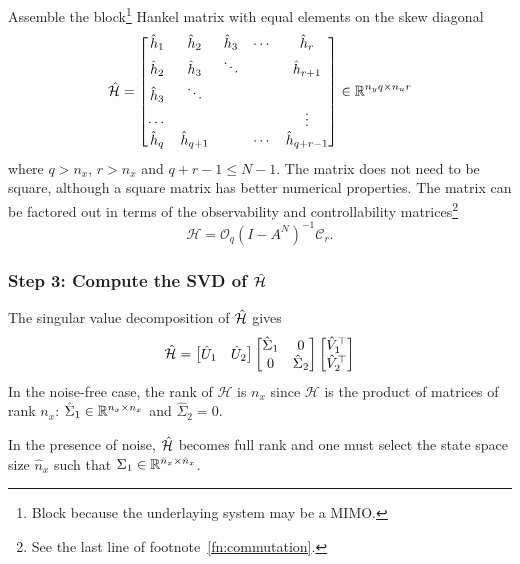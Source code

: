 Assemble the block\footnote{Block because the underlaying system may be a MIMO.} Hankel matrix with equal elements on the skew diagonal
\begin{equation*}
  \hat{\mathcal{H}} =
  \begin{bmatrix}
    \hat{h}_1 & \hat{h}_2 & \hat{h}_3 & \cdots & \hat{h}_r \\
    \hat{h}_2 & \hat{h}_3 & \ddots & & \hat{h}_{r+1} \\
    \hat{h}_3 & \ddots & & & \\
    \cdots & & & & \vdots \\
    \hat{h}_q & \hat{h}_{q+1} & & \cdots & \hat{h}_{q+r-1}
  \end{bmatrix} \in \mathbb{R}^{n_yq \times n_ur}
\end{equation*}
where $q>n_x$, $r>n_x$ and $q+r-1\leq N-1$. The matrix does not need to be square, although a square matrix has better numerical properties. The matrix can be factored out in terms of the observability and controllability matrices\footnote{See the last line of footnote~\ref{fn:commutation}.}
\begin{equation*}
  \mathcal{H} = \mathcal{O}_q \left(I - A^N\right)^{-1} \mathcal{C}_r.
\end{equation*}

\subsubsection{Step 3: Compute the SVD of $\hat{\mathcal{H}}$}

The singular value decomposition of $\hat{\mathcal{H}}$ gives
\begin{equation*}
  \hat{\mathcal{H}} =
  \begin{bmatrix}
    \hat{U}_1 & \hat{U}_2
  \end{bmatrix}
  \begin{bmatrix}
    \hat{\Sigma}_1 & 0 \\ 0 & \hat{\Sigma}_2
  \end{bmatrix}
  \begin{bmatrix}
    \hat{V}_1^\top \\ \hat{V}_2^\top
  \end{bmatrix}
\end{equation*}
In the noise-free case, the rank of $\mathcal{H}$ is $n_x$ since $\mathcal{H}$ is the product of matrices of rank $n_x$: $\hat{\Sigma}_1\in \mathbb{R}^{n_x\times n_x}$ and $\hat{\Sigma}_2=0$.

In the presence of noise, $\hat{\mathcal{H}}$ becomes full rank and one must select the state space size $\hat{n}_x$ such that $\Sigma_1 \in \mathbb{R}^{\hat{n}_x\times \hat{n}_x}$.

